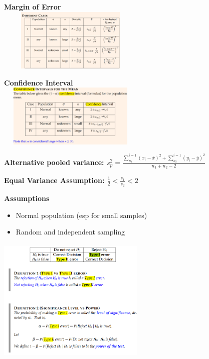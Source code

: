 \documentclass[10pt, landscape]{article}
\begin{document}
\begin{multicols}{4}


\textbf{Margin of Error}\\
\includegraphics[width=7cm, height=3cm]{moe.png}

\textbf{Confidence Interval}\\
\includegraphics[width=7cm, height=3cm]{ci.png}

\textbf{Alternative pooled variance: $s^2_p = \frac{\sum_{n_1}^{i=1}(x_i-\bar{x})^2 + \sum_{n_2}^{i=1}(y_i-\bar{y})^2}{n_1+n_2-2}$}



\textbf{Equal Variance Assumption: $\frac{1}{2} < \frac{s_1}{s_2} < 2$}

\textbf{Assumptions} \\
\begin{itemize}
  \item Normal population (esp for small samples)
  \item Random and independent sampling
\end{itemize}

\includegraphics[width=7cm, height=6cm]{errors.png}


\end{multicols}
\end{document}
